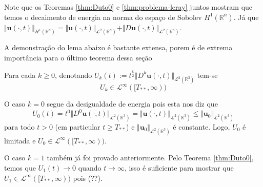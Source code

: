 \documentclass[a4paper, 11pt]{book}
\theoremstyle{definition}
\newcommand{\bR}{\mathbb{R}}
\newcommand{\bu}{\mathbf{u}}
\newcommand{\cL}{\mathcal{L}}
\begin{document}
Note que os Teoremas \ref{thm:Duto0} e \ref{thm:problema-leray} juntos mostram que temos o decaimento de energia na norma do espaço de Sobolev $H^1(\bR^n)$. Já que $\Vert \bu(\cdot,t) \Vert_{H^1(\bR^n)} = \Vert \bu(\cdot,t) \Vert_{\cL^2(\bR^n)} + \Vert D\bu(\cdot,t) \Vert_{\cL^2(\bR^n)}$.

A demonstração do lema abaixo é bastante extensa, porem é de extrema importância para o último teorema dessa seção

\begin{lbox}
    Para cada $k \geqslant 0$, denotando $U_k(t) := t^{\frac{k}{2}} \Vert D^k \bu(\cdot,t) \Vert_{\cL^2(\bR^3)}$ tem-se
    \[
        U_k \in \cL^\infty([T_{**}, \infty))
    \]
\end{lbox}
\begin{prf}
    O caso $k = 0$ segue da desigualdade de energia pois esta nos diz que
    \[
        U_0(t) =t^0 \Vert D^0\bu(\cdot,t) \Vert_{\cL^2(\bR^3)} = \Vert \bu(\cdot,t) \Vert_{\cL^2(\bR^3)} \leqslant \Vert \bu_0 \Vert_{\cL^2(\bR^3)}
    \]
    para todo $t > 0$ (em particular $t \geqslant T_{**}$) e $\Vert \bu_0 \Vert_{\cL^2(\bR^3)}$ é constante. Logo, $U_0$ é limitada e $U_0 \in \cL^{\infty}([T_{**}, \infty))$.

    O caso $k = 1$ também já foi provado anteriormente.
    Pelo Teorema \ref{thm:Duto0}, temos que $U_1(t) \to 0$ quando $t \to \infty$, isso é suficiente para mostrar que $U_1 \in \cL^\infty([T_{**}, \infty))$ pois (??).


\end{prf}
\end{document}
